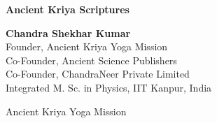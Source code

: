 \begin{center}

{\HUGE \bfseries Ancient Kriya Scriptures}

\vspace{2.5in}





{\huge \bfseries Chandra Shekhar Kumar}\\
{Founder, Ancient Kriya Yoga Mission}\\
{Co-Founder, Ancient Science Publishers}\\
{Co-Founder, ChandraNeer Private Limited}\\
{Integrated M. Sc. in Physics, IIT Kanpur, India}

\vspace{3.5in}

{\huge \calligra Ancient Kriya Yoga Mission}
\end{center}